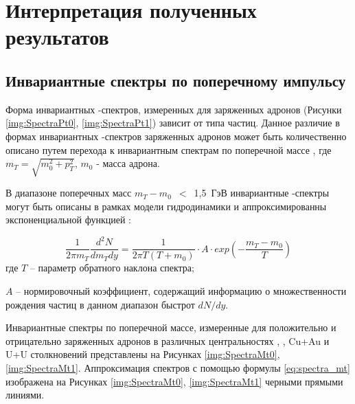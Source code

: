 \chapter{Интерпретация полученных результатов} \label{chapt5}

\section{Инвариантные спектры по поперечному импульсу} \label{sect5_spectra}

Форма инвариантных \pt-спектров, измеренных для заряженных адронов (Рисунки \ref{img:SpectraPt0}, \ref{img:SpectraPt1}) зависит от типа частиц.
Данное различие в формах инвариантных \pt-спектров заряженных адронов может быть количественно описано путем перехода к инвариантным спектрам по поперечной массе \mt, где $m_T = \sqrt{m_{0}^{2} + p_{T}^{2}}$, $m_0$ - масса адрона. 

В диапазоне поперечных масс $m_T-m_0$~$<$~1,5~ГэВ инвариантные \mt-спектры могут быть описаны в рамках модели гидродинамики \cite{PPG026, HydroPartonicCascade} и аппроксимированны экспоненциальной функцией \cite{ToutModels}:

\begin{equation}
	\label{eq:spectra_mt}
	\frac{1}{2\pi m_T} \frac{d^2 N}{dm_T dy}=\frac{1}{2\pi T (T+m_0)}\cdot A \cdot exp \left( -\frac{m_T - m_0}{T}\right)
\end{equation}
где $T$ -- параметр обратного наклона спектра;

$A$ -- нормировочный коэффициент, содержащий информацию о множественности рождения частиц в данном диа­пазон быстрот $dN/dy$.

Инвариантные спектры по поперечной массе, измеренные для положительно и отрицательно заряженных адронов в различных центральностях \pal, \heau, Cu+Au и U+U столкновений представлены на Рисунках \ref{img:SpectraMt0}, \ref{img:SpectraMt1}. Аппроксимация спектров с помощью формулы \ref{eq:spectra_mt} изображена на Рисунках \ref{img:SpectraMt0}, \ref{img:SpectraMt1} черными прямыми линиями.

